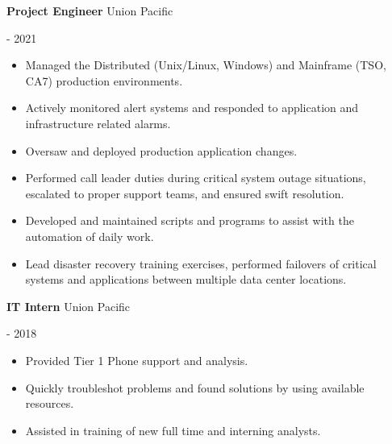 \documentclass[10pt, a4paper]{article}
\begin{document}
\begin{itemize}
\begin{minipage}{0.5\textwidth}
        \raggedright %
        \item \textbf{Project Engineer} Union Pacific
    \end{minipage}
    \begin{minipage}{0.5\textwidth} %
         \-- 2021
    \end{minipage}
    \begin{itemize}
        \item Managed the Distributed (Unix/Linux, Windows) and Mainframe (TSO, CA7) production environments.
        \item Actively monitored alert systems and responded to application and infrastructure related alarms.
        \item Oversaw and deployed production application changes.
        \item Performed call leader duties during critical system outage situations, escalated to proper support teams, and ensured swift resolution.
        \item Developed and maintained scripts and programs to assist with the automation of daily work.
        \item Lead disaster recovery training exercises, performed failovers of critical systems and applications between multiple data center locations.
    \end{itemize}
    \begin{minipage}{0.5\textwidth} %
        \raggedright %
        \item \textbf{IT Intern} Union Pacific
    \end{minipage}
    \begin{minipage}{0.5\textwidth} %
         \-- 2018
    \end{minipage}
    \begin{itemize}
        \item Provided Tier 1 Phone support and analysis.
        \item Quickly troubleshot problems and found solutions by using available resources.
        \item Assisted in training of new full time and interning analysts.
    \end{itemize}
\end{itemize}
\end{document}
